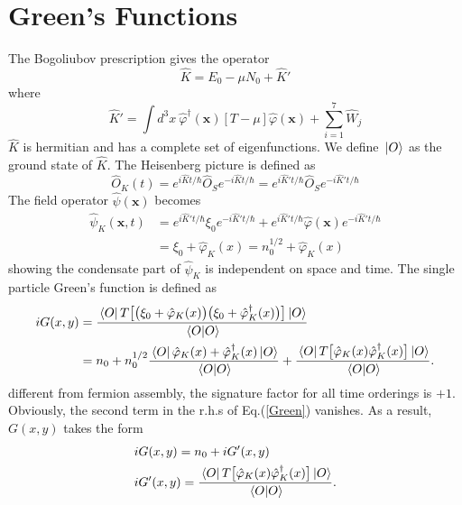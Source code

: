 \documentclass[12pt]{article}
\begin{document}
\section{Green's Functions}
The Bogoliubov prescription gives the operator 
\begin{equation}
    \hat{K}=E_0-\mu N_0+\hat{K}'
\end{equation} 
where 
\begin{equation}\label{Kprime}
    \hat{K}'=\int d^3x\ \hat{\varphi}^\dagger(\mathbf{x})[T-\mu]\hat{\varphi}(\mathbf{x})
    +\sum_{i=1}^7\hat{W}_j
\end{equation}
$\hat{K}$ is hermitian and has a complete set of eigenfunctions. We define $\ket*{O}$ 
as the ground state of $\hat{K}$. The Heisenberg picture is defined as 
\begin{equation}\label{Heisenberg}
    \hat{O}_{K}(t)=e^{i\hat{K}t/\hbar}\hat{O}_{S}e^{-i\hat{K}t/\hbar}
    =e^{i\hat{K}'t/\hbar}\hat{O}_{S}e^{-i\hat{K}'t/\hbar}
\end{equation}
The field operator $\hat{\psi}(\mathbf{x})$ becomes 
\begin{equation}
    \begin{aligned}
        \hat{\psi}_K(\mathbf{x},t)&=e^{i\hat{K}'t/\hbar}\xi_{0} e^{-i\hat{K}'t/\hbar}
        +e^{i\hat{K}'t/\hbar}\hat{\varphi}(\mathbf{x})e^{-i\hat{K}'t/\hbar}\\
        &=\xi_0+\hat{\varphi}_{K}(x)=n_0^{1/2}+\hat{\varphi}_{K}(x)
        \end{aligned}
\end{equation}
showing the condensate part of $\hat{\psi}_K$ is independent on space and time.
The single particle Green's function is defined as 
\begin{equation}
    \begin{split}
        iG(x,y)&=\frac{\bra*{O}T\big[\big(\xi_0+\hat{\varphi}_K(x)\big)\big(\xi_0+
        \hat{\varphi}^\dagger_K(x)\big)\big]\ket*{O}}{\bra*{O}\ket*{O}}\\
        &=n_0+n_0^{1/2}\frac{\bra*{O}\hat{\varphi}_K(x)+\hat{\varphi}^\dagger_K(x)
        \ket*{O}}{\bra*{O}\ket*{O}}+\frac{\bra*{O}T\big[\hat{\varphi}_K(x)\hat{\varphi}
        ^\dagger_K(x)\big]\ket*{O}}{\bra*{O}\ket*{O}}.
    \end{split}\label{Green}
\end{equation}
different from fermion assembly, the signature factor for all time orderings is $+1$. 
Obviously, the second term in the r.h.s of Eq.(\ref{Green}) vanishes. As a result, 
$G(x,y)$ takes the form 
\begin{align}
    &iG(x,y)=n_0+iG'(x,y)\\
    &iG'(x,y)=\frac{\bra*{O}T\big[\hat{\varphi}_K(x)\hat{\varphi}^\dagger_K(x)\big]
    \ket*{O}}{\bra*{O}\ket*{O}}.
\end{align}
\end{document}
